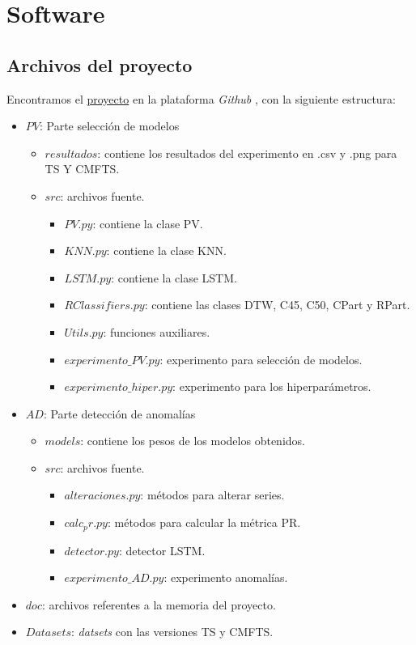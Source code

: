 
\chapter{Software}\label{ap:software}

\section{Archivos del proyecto}

Encontramos el \href{https://github.com/MiguelLentisco/tfg}{proyecto} en la plataforma \emph{Github} , con la siguiente estructura:

\begin{itemize}
  \item $PV$: Parte selección de modelos
    \begin{itemize}
      \item $resultados$: contiene los resultados del experimento en .csv y .png para TS Y CMFTS.
      \item $src$: archivos fuente.
      \begin{itemize}
        \item $PV.py$: contiene la clase PV.
        \item $KNN.py$: contiene la clase KNN.
        \item $LSTM.py$: contiene la clase LSTM.
        \item $RClassifiers.py$: contiene las clases DTW, C45, C50, CPart y RPart.
        \item $Utils.py$: funciones auxiliares.
        \item $experimento\_PV.py$: experimento para selección de modelos.
        \item $experimento\_hiper.py$: experimento para los hiperparámetros.
      \end{itemize}
    \end{itemize}
  \item $AD$: Parte detección de anomalías
    \begin{itemize}
      \item $models$: contiene los pesos de los modelos obtenidos.
      \item $src$: archivos fuente.
        \begin{itemize}
          \item $alteraciones.py$: métodos para alterar series.
          \item $calc_pr.py$: métodos para calcular la métrica PR.
          \item $detector.py$: detector LSTM.
          \item $experimento\_AD.py$: experimento anomalías.
        \end{itemize}
    \end{itemize}
  \item $doc$: archivos referentes a la memoria del proyecto.
  \item $Datasets$: \emph{datsets} con las versiones TS y CMFTS.

\end{itemize}

